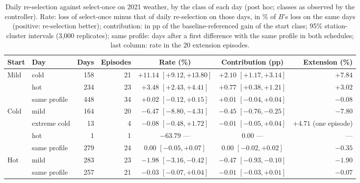 \begin{table}[!htbp]
\centering
\caption{Daily re-selection against select-once on 2021 weather, by the class of each day (post hoc; classes as observed by the
controller). Rate: loss of select-once minus that of daily re-selection on those days, in \% of $B$'s loss on the same days
(positive: re-selection better); contribution: in pp of the baseline-referenced gain of the start class; 95\% station-cluster
intervals (3{,}000 replicates); same profile: days after a first difference with the same profile in both schedules; last
column: rate in the 20 extension episodes.}
\label{tab:direction}
\footnotesize
\setlength{\tabcolsep}{4pt}
\begin{tabular}{llrrccr}
\toprule
Start & Day & Days & Episodes & Rate (\%) & Contribution (pp) & Extension (\%)\\
\midrule
Mild & cold & 158 & 21 & $+11.14$ $[+9.12, +13.80]$ & $+2.10$ $[+1.17, +3.14]$ & $+7.84$\\
 & hot & 234 & 23 & $+3.48$ $[+2.43, +4.41]$ & $+0.77$ $[+0.38, +1.21]$ & $+3.02$\\
 & same profile & 448 & 34 & $+0.02$ $[-0.12, +0.15]$ & $+0.01$ $[-0.04, +0.04]$ & $-0.08$\\
\midrule
Cold & mild & 164 & 20 & $-6.47$ $[-8.80, -4.31]$ & $-0.45$ $[-0.76, -0.25]$ & $-7.80$\\
 & extreme cold & 13 & 4 & $-0.08$ $[-0.48, +1.72]$ & $-0.01$ $[-0.05, +0.04]$ & $+4.71$ (one episode)\\
 & hot & 1 & 1 & $-63.79$ --- & $0.00$ --- & ---\\
 & same profile & 279 & 24 & $0.00$ $[-0.05, +0.07]$ & $0.00$ $[-0.02, +0.02]$ & $-0.35$\\
\midrule
Hot & mild & 283 & 23 & $-1.98$ $[-3.16, -0.42]$ & $-0.47$ $[-0.93, -0.10]$ & $-1.90$\\
 & same profile & 257 & 21 & $-0.03$ $[-0.07, +0.04]$ & $-0.01$ $[-0.03, +0.01]$ & $-0.07$\\
\bottomrule
\end{tabular}
\end{table}


